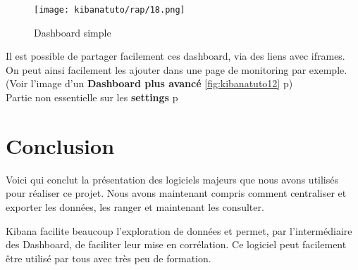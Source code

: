 \begin{figure}[H]
\center
\texttt{[image: kibanatuto/rap/18.png]}
\label{fig:kibanatuto11}
\caption{Dashboard simple}
\end{figure}

Il est possible de partager facilement ces dashboard, via des liens avec 
iframes. On peut ainsi facilement les ajouter dans une page de monitoring par exemple.\\[2mm]
(Voir l'image d'un \textbf{Dashboard plus avancé} \ref{fig:kibanatuto12} p\pageref{fig:kibanatuto12})\\[2mm]
Partie non essentielle sur les \textbf{settings} p\pageref{subsec:settings}

\section{Conclusion}
Voici qui conclut la présentation des logiciels majeurs que nous avons
utilisés pour réaliser ce projet. Nous avons maintenant compris comment
centraliser et exporter les données, les ranger et maintenant les consulter.


Kibana facilite beaucoup l'exploration de données et permet, par l'intermédiaire 
des Dashboard,  de faciliter leur mise en corrélation. Ce logiciel peut facilement
être utilisé par tous avec très peu de formation.
